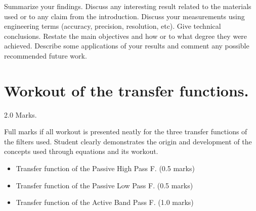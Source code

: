 \documentclass[journal]{IEEEtran}
\begin{document}
Summarize your findings. Discuss any interesting result related to the materials used or to any claim from the introduction. Discuss your measurements using engineering terms (accuracy, precision, resolution, etc).  Give technical conclusions. Restate the main objectives and how or to what degree they were achieved. Describe some applications of your results and comment any possible recommended future work.




%


\appendices
\section{Workout of the transfer functions.}
\begin{flushright} 2.0 Marks. \end{flushright}
Full marks if all workout is presented neatly for the three transfer functions of the filters used. Student clearly demonstrates the origin and development of the concepts used through equations and its workout.
\begin{itemize}

    \item  Transfer function of the Passive High Pass F. (0.5 marks)
    \item Transfer function of the Passive Low Pass F. (0.5 marks)
    \item  Transfer function of the Active Band Pass F. (1.0 marks)

\end{itemize}
\end{document}
